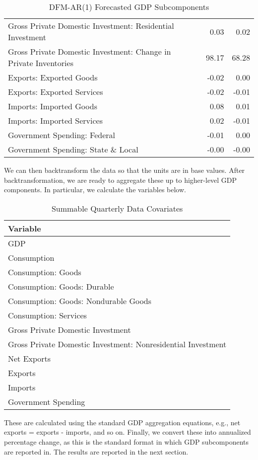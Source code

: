 \documentclass[11pt, letterpaper]{article}\usepackage[]{graphicx}\usepackage[]{color}
\begin{document}
\begin{table}[H]
\begin{tabular}{lrr}
  Gross Private Domestic Investment: Residential Investment & 0.03 & 0.02 \\ 
  Gross Private Domestic Investment: Change in Private Inventories & 98.17 & 68.28 \\ 
  Exports: Exported Goods & -0.02 & 0.00 \\ 
  Exports: Exported Services & -0.02 & -0.01 \\ 
  Imports: Imported Goods & 0.08 & 0.01 \\ 
  Imports: Imported Services & 0.02 & -0.01 \\ 
  Government Spending: Federal & -0.01 & 0.00 \\ 
  Government Spending: State \& Local & -0.00 & -0.00 \\ 
   \hline
\end{tabular}
\endgroup
\caption{DFM-AR(1) Forecasted GDP Subcomponents} 
\end{table}


We can then backtransform the data so that the units are in base values. After backtransformation, we are ready to aggregate these up to higher-level GDP components. In particular, we calculate the variables below.
\begin{table}[H]
\centering
\begingroup\scriptsize
\begin{tabular}{l}
  \hline
Variable \\ 
  \hline
GDP \\ 
  Consumption \\ 
  Consumption: Goods \\ 
  Consumption: Goods: Durable \\ 
  Consumption: Goods: Nondurable Goods \\ 
  Consumption: Services \\ 
  Gross Private Domestic Investment \\ 
  Gross Private Domestic Investment: Nonresidential Investment \\ 
  Net Exports \\ 
  Exports \\ 
  Imports \\ 
  Government Spending \\ 
   \hline
\end{tabular}
\endgroup
\caption{Summable Quarterly Data Covariates} 
\end{table}

These are calculated using the standard GDP aggregation equations, e.g., net exports = exports - imports, and so on.
Finally, we convert these into annualized percentage change, as this is the standard format in which GDP subcomponents are reported in. The results are reported in the next section.
\end{document}
